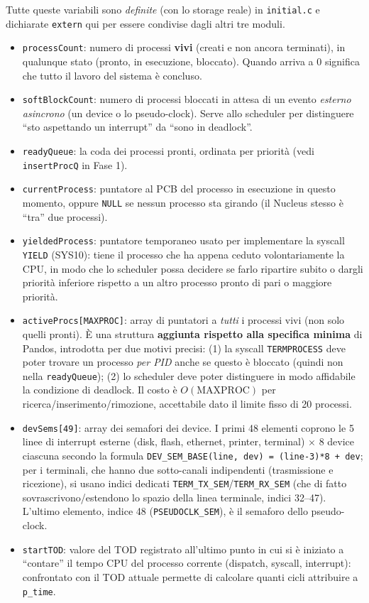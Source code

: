 \documentclass[11pt,a4paper]{article}
\newcommand{\code}[1]{\texttt{#1}}
\begin{document}
Tutte queste variabili sono \emph{definite} (con lo storage reale) in
\code{initial.c} e dichiarate \code{extern} qui per essere condivise dagli
altri tre moduli.

\begin{itemize}
\item \code{processCount}: numero di processi \textbf{vivi} (creati e non
  ancora terminati), in qualunque stato (pronto, in esecuzione, bloccato).
  Quando arriva a 0 significa che tutto il lavoro del sistema è concluso.
\item \code{softBlockCount}: numero di processi bloccati in attesa di un
  evento \emph{esterno asincrono} (un device o lo pseudo-clock). Serve allo
  scheduler per distinguere ``sto aspettando un interrupt'' da ``sono in
  deadlock''.
\item \code{readyQueue}: la coda dei processi pronti, ordinata per priorità
  (vedi \code{insertProcQ} in Fase 1).
\item \code{currentProcess}: puntatore al PCB del processo in esecuzione in
  questo momento, oppure \code{NULL} se nessun processo sta girando (il
  Nucleus stesso è ``tra'' due processi).
\item \code{yieldedProcess}: puntatore temporaneo usato per implementare la
  syscall \code{YIELD} (SYS10): tiene il processo che ha appena ceduto
  volontariamente la CPU, in modo che lo scheduler possa decidere se farlo
  ripartire subito o dargli priorità inferiore rispetto a un altro processo
  pronto di pari o maggiore priorità.
\item \code{activeProcs[MAXPROC]}: array di puntatori a \emph{tutti} i
  processi vivi (non solo quelli pronti). \`E una struttura \textbf{aggiunta
  rispetto alla specifica minima} di Pandos, introdotta per due motivi
  precisi: (1) la syscall \code{TERMPROCESS} deve poter trovare un processo
  \emph{per PID} anche se questo è bloccato (quindi non nella
  \code{readyQueue}); (2) lo scheduler deve poter distinguere in modo
  affidabile la condizione di deadlock. Il costo è $O(\text{MAXPROC})$ per
  ricerca/inserimento/rimozione, accettabile dato il limite fisso di 20
  processi.
\item \code{devSems[49]}: array dei semafori dei device. I primi 48 elementi
  coprono le 5 linee di interrupt esterne (disk, flash, ethernet, printer,
  terminal) $\times$ 8 device ciascuna secondo la formula
  \code{DEV\_SEM\_BASE(line, dev) = (line-3)*8 + dev}; per i terminali,
  che hanno due sotto-canali indipendenti (trasmissione e ricezione), si
  usano indici dedicati \code{TERM\_TX\_SEM}/\code{TERM\_RX\_SEM} (che di
  fatto sovrascrivono/estendono lo spazio della linea terminale, indici
  32--47). L'ultimo elemento, indice 48 (\code{PSEUDOCLK\_SEM}), è il
  semaforo dello pseudo-clock.
\item \code{startTOD}: valore del TOD registrato all'ultimo punto in cui si
  è iniziato a ``contare'' il tempo CPU del processo corrente (dispatch,
  syscall, interrupt): confrontato con il TOD attuale permette di calcolare
  quanti cicli attribuire a \code{p\_time}.
\end{itemize}
\end{document}
